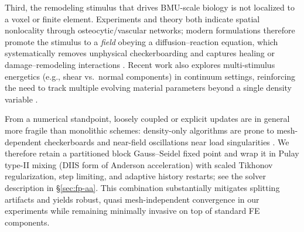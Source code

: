 Third, the remodeling stimulus that drives BMU-scale biology is not localized to a voxel or finite element. Experiments and theory both indicate spatial nonlocality through osteocytic/vascular networks; modern formulations therefore promote the stimulus to a \emph{field} obeying a diffusion--reaction equation, which systematically removes unphysical checkerboarding and captures healing or damage--remodeling interactions \cite{Giorgio2019_MechanicallyDrivenBiological, Addessi2024_BoneRemodelingApproach, Kobler2024_GradientEnhancedBone}.
Recent work also explores multi-stimulus energetics (e.g., shear vs.\ normal components) in continuum settings, reinforcing the need to track multiple evolving material parameters beyond a single density variable \cite{Branecka2024_BoneRemodelingModel}.

From a numerical standpoint, loosely coupled or explicit updates are in general more fragile than monolithic schemes: density-only algorithms are prone to mesh-dependent checkerboards and near-field oscillations near load singularities \cite{Jacobs1995_NumericalInstabilitiesBone, Kobler2024_GradientEnhancedBone}. We therefore retain a partitioned block Gauss--Seidel fixed point and wrap it in Pulay type-II mixing (DIIS form of Anderson acceleration) with scaled Tikhonov regularization, step limiting, and adaptive history restarts; see the solver description in \S\ref{sec:fp-aa}. This combination substantially mitigates splitting artifacts and yields robust, quasi mesh-independent convergence in our experiments \cite{Pulay1980_ConvergenceAcceleration, Both2019_AndersonAcceleratedFixed, Walker2011_AndersonAcceleration, Fang2009_TwoClassesMultisecant} while remaining minimally invasive on top of standard FE components.
